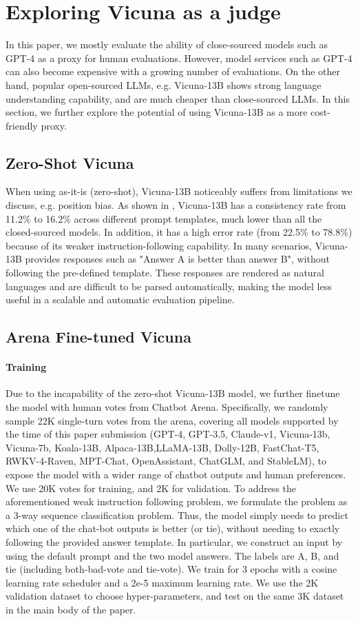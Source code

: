 \clearpage
\newpage
\section{Exploring Vicuna as a judge}
\label{sec:vicuna-judge}
In this paper, we mostly evaluate the ability of close-sourced models such as GPT-4 as a proxy for human evaluations. However, model services such as GPT-4 can also become expensive with a growing number of evaluations. On the other hand, popular open-sourced LLMs, e.g. Vicuna-13B shows strong language understanding capability, and are much cheaper than close-sourced LLMs. In this section, we further explore the potential of using Vicuna-13B as a more cost-friendly proxy. 

\subsection{Zero-Shot Vicuna}
When using as-it-is (zero-shot), Vicuna-13B noticeably suffers from limitations we discuss, e.g. position bias. As shown in , Vicuna-13B has a consistency rate from 11.2\% to 16.2\% across different prompt templates, much lower than all the closed-sourced models. In addition, it has a high error rate (from 22.5\% to 78.8\%) because of its weaker instruction-following capability. In many scenarios, Vicuna-13B provides responses such as "Answer A is better than answer B", without following the pre-defined template. These responses are rendered as natural languages and are difficult to be parsed automatically, making the model less useful in a scalable and automatic evaluation pipeline. 

\subsection{Arena Fine-tuned Vicuna}
\paragraph{Training}
Due to the incapability of the zero-shot Vicuna-13B model, we further finetune the model with human votes from Chatbot Arena. Specifically, we randomly sample 22K single-turn votes from the arena, covering all models supported by the time of this paper submission (GPT-4, GPT-3.5, Claude-v1, Vicuna-13b, Vicuna-7b, Koala-13B, Alpaca-13B,LLaMA-13B, Dolly-12B, FastChat-T5, RWKV-4-Raven, MPT-Chat, OpenAssistant, ChatGLM, and StableLM), to expose the model with a wider range of chatbot outputs and human preferences. We use 20K votes for training, and 2K for validation. To address the aforementioned weak instruction following problem, we formulate the problem as a 3-way sequence classification problem. Thus, the model simply needs to predict which one of the chat-bot outputs is better (or tie), without needing to exactly following the provided answer template.
In particular, we construct an input by using the default prompt and the two model answers. The labels are A, B, and tie (including both-bad-vote and tie-vote).
We train for 3 epochs with a cosine learning rate scheduler and a 2e-5 maximum learning rate. We use the 2K validation dataset to choose hyper-parameters, and test on the same 3K dataset in the main body of the paper.

